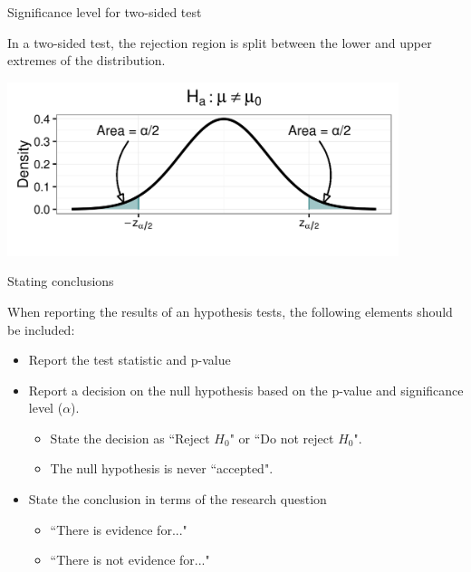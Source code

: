 \documentclass[xcolor=table]{beamer}
\begin{document}
\begin{frame}{Significance level for two-sided test}
\begin{block}{}
\large
In a two-sided test, the rejection region is split between the lower and upper extremes of the distribution.
\end{block}
\bigskip
{\centering
\includegraphics[width=4.5in]{../images/ch08_sig_2}
\par}

\end{frame}


\begin{frame}{Stating conclusions}
\begin{block}{}
\large
When reporting the results of an hypothesis tests, the following elements should be included:
\begin{itemize}
\pause\item Report the test statistic and p-value
\pause\item Report a decision on the null hypothesis based on the p-value and significance level ($\alpha$). 
\begin{itemize}
\item State the decision as ``Reject $H_0$" or ``Do not reject $H_0$".
\item The null hypothesis is never ``accepted".
\end{itemize}
\pause\item State the conclusion in terms of the research question
\begin{itemize}
\item ``There is evidence for..."
\item ``There is not evidence for..."
\end{itemize}
\end{itemize}
\end{block}
\end{frame}
\end{document}

